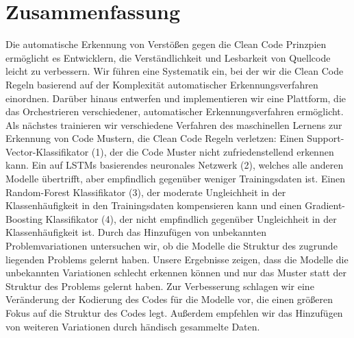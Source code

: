 \section*{Zusammenfassung}

Die automatische Erkennung von Verstößen gegen die Clean Code Prinzpien ermöglicht es Entwicklern, die Verständlichkeit und Lesbarkeit von Quellcode leicht zu verbessern. Wir führen eine Systematik ein, bei der wir die Clean Code Regeln basierend auf der Komplexität automatischer Erkennungsverfahren einordnen. Darüber hinaus entwerfen und implementieren wir eine Plattform, die das Orchestrieren verschiedener, automatischer Erkennungsverfahren ermöglicht. Als nächstes trainieren wir verschiedene Verfahren des maschinellen Lernens zur Erkennung von Code Mustern, die Clean Code Regeln verletzen: Einen Support-Vector-Klassifikator (1), der die Code Muster nicht zufriedenstellend erkennen kann. Ein auf LSTMs basierendes neuronales Netzwerk (2), welches alle anderen Modelle übertrifft, aber empfindlich gegenüber weniger Trainingsdaten ist. Einen Random-Forest Klassifikator (3), der moderate Ungleichheit in der Klassenhäufigkeit in den Trainingsdaten kompensieren kann und einen Gradient-Boosting Klassifikator (4), der nicht empfindlich gegenüber Ungleichheit in der Klassenhäufigkeit ist. Durch das Hinzufügen von unbekannten Problemvariationen untersuchen wir, ob die Modelle die Struktur des zugrunde liegenden Problems gelernt haben. Unsere Ergebnisse zeigen, dass die Modelle die unbekannten Variationen schlecht erkennen können und nur das Muster statt der Struktur des Problems gelernt haben. Zur Verbesserung schlagen wir eine Veränderung der Kodierung des Codes für die Modelle vor, die einen größeren Fokus auf die Struktur des Codes legt. Außerdem empfehlen wir das Hinzufügen von weiteren Variationen durch händisch gesammelte Daten.
 
\newpage

